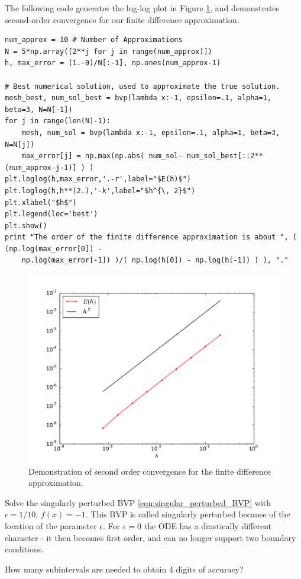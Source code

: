 The following code generates the log-log plot in Figure \ref{fig:finitedifference2}, and demonstrates second-order convergence for our finite difference approximation.
\begin{lstlisting}
num_approx = 10 # Number of Approximations
N = 5*np.array([2**j for j in range(num_approx)])
h, max_error = (1.-0)/N[:-1], np.ones(num_approx-1)

# Best numerical solution, used to approximate the true solution.
mesh_best, num_sol_best = bvp(lambda x:-1, epsilon=.1, alpha=1, beta=3, N=N[-1])
for j in range(len(N)-1):
    mesh, num_sol = bvp(lambda x:-1, epsilon=.1, alpha=1, beta=3, N=N[j])
    max_error[j] = np.max(np.abs( num_sol- num_sol_best[::2**(num_approx-j-1)] ) )
plt.loglog(h,max_error,'.-r',label="$E(h)$")
plt.loglog(h,h**(2.),'-k',label="$h^{\, 2}$")
plt.xlabel("$h$")
plt.legend(loc='best')
plt.show()
print "The order of the finite difference approximation is about ", ( (np.log(max_error[0]) -
    np.log(max_error[-1]) )/( np.log(h[0]) - np.log(h[-1]) ) ), "."
\end{lstlisting}

\begin{figure}[ht]
\centering
\includegraphics[width=12cm]{example_convergence.pdf}
\caption{Demonstration of second order convergence for the finite difference approximation.} \label{fig:finitedifference2}
\end{figure}

\begin{problem}
Solve the singularly perturbed BVP \eqref{eqn:singular_perturbed_BVP} with $\epsilon = 1/10$, $f(x) = -1$.
This BVP is called singularly perturbed because of the location of the parameter $\epsilon$.
For $\epsilon = 0$ the ODE has a drastically different character - it then becomes first order, and can no longer support two boundary conditions.
	
How many subintervals are needed to obtain 4 digits of accuracy?
	\label{prob:finitedifference2:prob1}
\end{problem}



